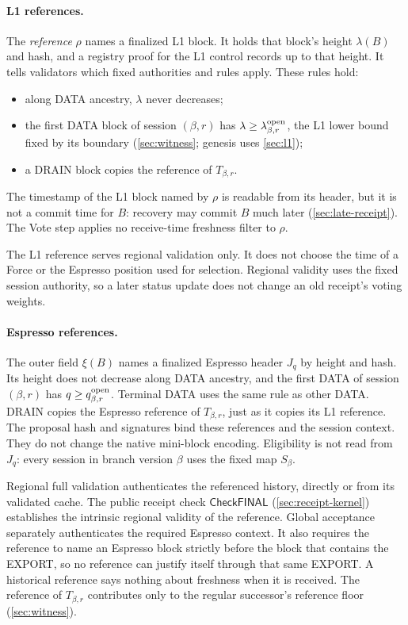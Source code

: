 \documentclass[11pt,a4paper]{article}
\newcommand{\tagg}[1]{\ensuremath{\mathsf{#1}}}
\newcommand{\defterm}[1]{\textcolor{rrBlue}{\textit{#1}}}
\begin{document}
\paragraph{L1 references.}
The \defterm{reference} $\rho$ names a finalized L1 block. It holds that
block's height $\lambda(B)$ and hash, and a registry proof for the L1
control records up to that height. It tells validators which fixed
authorities and rules apply. These rules hold:
\begin{itemize}
\item along DATA ancestry, $\lambda$ never decreases;
\item the first DATA block of session $(\beta,r)$ has $\lambda\ge
\lambda^{\rm open}_{\beta,r}$, the L1 lower bound fixed by its boundary
(\cref{sec:witness}; genesis uses \cref{sec:l1});
\item a DRAIN block copies the reference of $T_{\beta,r}$.
\end{itemize}
The timestamp of the L1 block named by $\rho$ is readable from its
header, but it is not a commit time for $B$: recovery may commit $B$
much later (\cref{sec:late-receipt}). The Vote step applies no
receive-time freshness filter to $\rho$.

The L1 reference serves regional validation only. It does not choose
the time of a Force or the Espresso position used for selection.
Regional validity uses the fixed session authority, so a later status
update does not change an old receipt's voting weights.

\paragraph{Espresso references.}
The outer field $\xi(B)$ names a finalized Espresso header $J_q$ by
height and hash. Its height does not decrease along DATA ancestry, and
the first DATA of session $(\beta,r)$ has
$q\ge q_{\beta,r}^{\rm open}$. Terminal DATA uses the same rule as other
DATA. DRAIN copies the Espresso reference of $T_{\beta,r}$, just as it
copies its L1 reference. The proposal hash and signatures bind these
references and the session context. They do not change the native
mini-block encoding. Eligibility is not read from $J_q$: every session
in branch version $\beta$ uses the fixed map $S_\beta$.

Regional full validation authenticates the referenced history, directly
or from its validated cache. The public receipt check \tagg{CheckFINAL}
(\cref{sec:receipt-kernel}) establishes the intrinsic regional validity
of the reference. Global acceptance separately authenticates the
required Espresso context. It also requires the reference to name an
Espresso block strictly before the block that contains the EXPORT, so no
reference can justify itself through that same EXPORT. A historical
reference says nothing about freshness when it is received. The
reference of $T_{\beta,r}$ contributes only to the regular successor's
reference floor (\cref{sec:witness}).
\end{document}
